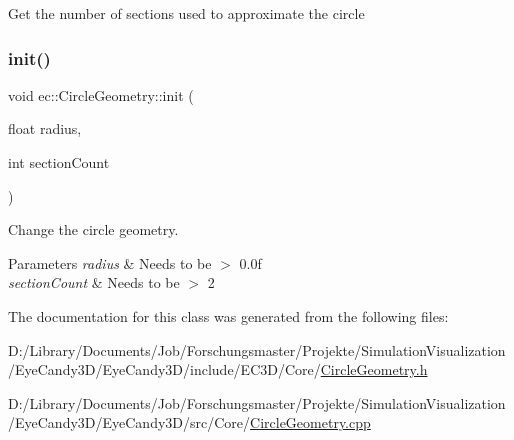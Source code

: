 Get the number of sections used to approximate the circle \mbox{\label{classec_1_1_circle_geometry_aef6ab090302b5370c4369ec3f806f98e}} 
\subsubsection{\texorpdfstring{init()}{init()}}
{\footnotesize\ttfamily void ec\+::\+Circle\+Geometry\+::init (\begin{DoxyParamCaption}\item[{float}]{radius,  }\item[{int}]{section\+Count }\end{DoxyParamCaption})}



Change the circle geometry. 


\begin{DoxyParams}{Parameters}
{\em radius} & Needs to be $>$ 0.\+0f \\
\hline
{\em section\+Count} & Needs to be $>$ 2 \\
\hline
\end{DoxyParams}


The documentation for this class was generated from the following files\+:\begin{DoxyCompactItemize}
\item 
D\+:/\+Library/\+Documents/\+Job/\+Forschungsmaster/\+Projekte/\+Simulation\+Visualization/\+Eye\+Candy3\+D/\+Eye\+Candy3\+D/include/\+E\+C3\+D/\+Core/\mbox{\hyperlink{_circle_geometry_8h}{Circle\+Geometry.\+h}}\item 
D\+:/\+Library/\+Documents/\+Job/\+Forschungsmaster/\+Projekte/\+Simulation\+Visualization/\+Eye\+Candy3\+D/\+Eye\+Candy3\+D/src/\+Core/\mbox{\hyperlink{_circle_geometry_8cpp}{Circle\+Geometry.\+cpp}}\end{DoxyCompactItemize}
